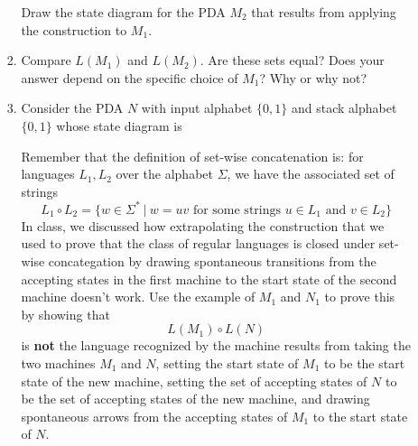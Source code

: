 \begin{enumerate}[wide, labelwidth=!, labelindent=0pt]
\begin{enumerate}
\begin{enumerate}
\begin{center}
\end{center}

Draw the state diagram for the PDA $M_2$ that results from applying 
the construction to $M_1$.

\item\gradeComplete Compare $L(M_1)$ and $L(M_2)$. Are these sets 
equal? Does your answer depend on the specific choice of $M_1$? Why or why not?

\item\gradeComplete Consider the PDA $N$ with input alphabet $\{0,1\}$ and
stack alphabet $\{0,1\}$ whose state diagram is 

\begin{center}

\end{center}

   Remember that the definition of set-wise concatenation is:
    for languages $L_1, L_2$ over the alphabet $\Sigma$, we have the 
    associated set of strings
    \[
       L_1 \circ L_2 = \{ w \in \Sigma^* ~|~ w = uv \text{ for some strings } u \in L_1 \text{ and } v \in L_2 \}
    \]
    In class, we discussed how extrapolating the construction that we used to prove that the class of regular languages
    is closed under set-wise concategation by drawing 
    spontaneous transitions from the accepting states in the first 
    machine to the start state of the second machine doesn't work.
    Use the example of $M_1$ and $N_1$ to prove this by showing that
    \[
    L(M_1) \circ L(N)
    \]
    is {\bf not} the language recognized by the machine 
    results from taking the two machines
    $M_1$ and $N$, setting the start state of $M_1$ to be the start state of 
    the new machine, setting the set of accepting states of $N$ to be
    the set of accepting states of the new machine, and drawing spontaneous 
    arrows from the accepting states
    of $M_1$ to the start state of $N$.


\end{enumerate}
\end{enumerate}
\end{enumerate}
